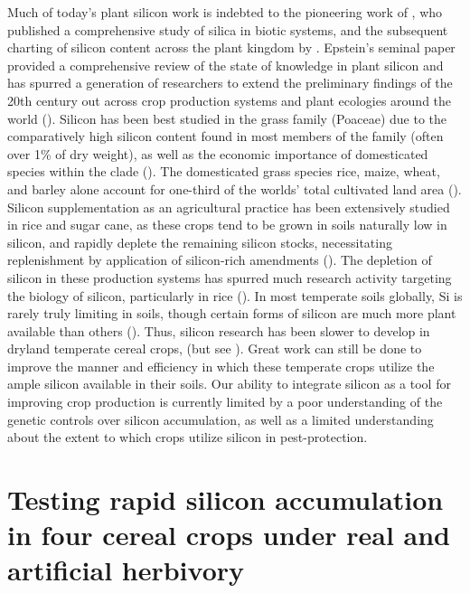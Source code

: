 \documentclass[12pt, letterpaper]{report}
\begin{document}
Much of today’s plant silicon work is indebted to the pioneering work of \textcite{jones_silica_1967}, who published a comprehensive study of silica in biotic systems, and the subsequent charting of silicon content across the plant kingdom by \textcite{takahashi_possibility_1990}. Epstein’s  seminal paper provided a comprehensive review of the state of knowledge in plant silicon and has spurred a generation of researchers to extend the preliminary findings of the 20th century out across crop production systems and plant ecologies around the world (\cite{cooke_is_2011,hartley_ecology_2016,coskun_controversies_2019,de_tombeur_silicon_2021,christian_breeding_2022}). Silicon has been best studied in the grass family (Poaceae) due to the comparatively high silicon content found in most members of the family (often over 1\% of dry weight), as well as the economic importance of domesticated species within the clade (\cite{reynolds_silicon_2016}). The domesticated grass species rice, maize, wheat, and barley alone account for one-third of the worlds’ total cultivated land area (\cite{faostat}). Silicon supplementation as an agricultural practice has been extensively studied in rice and sugar cane, as these crops tend to be grown in soils naturally low in silicon, and rapidly deplete the remaining silicon stocks, necessitating replenishment by application of silicon-rich amendments (\cite{haynes_contemporary_2014,meena_case_2014}). The depletion of silicon in these production systems has spurred much research activity targeting the biology of silicon, particularly in rice (\cite{deren_variable_1992-1,dai_genetic_2005,rodrigues_silicon_2004,ye_priming_2013}). In most temperate soils globally, Si is rarely truly limiting in soils, though certain forms of silicon are much more plant available than others (\cite{fraysse_surface_2009}). Thus, silicon research has been slower to develop in dryland temperate cereal crops, (but see \cite{rains_active_2006,ahmad_silicon_2016,neu_silicon_2017}). Great work can still be done to improve the manner and efficiency in which these temperate crops utilize the ample silicon available in their soils. Our ability to integrate silicon as a tool for improving crop production is currently limited by a poor understanding of the genetic controls over silicon accumulation, as well as a limited understanding about the extent to which crops utilize silicon in pest-protection. 


\chapter{Testing rapid silicon accumulation in four cereal crops under real and artificial herbivory}
\end{document}
